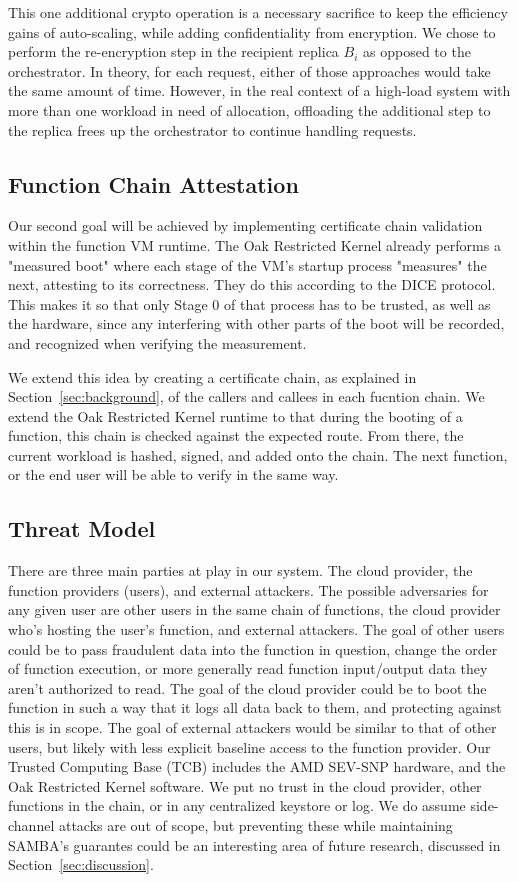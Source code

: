 This one additional crypto operation is a necessary sacrifice to keep the efficiency gains of auto-scaling, while adding confidentiality from encryption.
We chose to perform the re-encryption step in the recipient replica $B_i$ as opposed to the orchestrator.
In theory, for each request, either of those approaches would take the same amount of time.
However, in the real context of a high-load system with more than one workload in need of allocation, offloading the additional step to the replica frees up the orchestrator to continue handling requests.


\subsection{Function Chain Attestation}

Our second goal will be achieved by implementing certificate chain validation within the function VM runtime.
The Oak Restricted Kernel already performs a "measured boot" where each stage of the VM's startup process "measures" the next, attesting to its correctness.
They do this according to the DICE protocol.
This makes it so that only Stage 0 of that process has to be trusted, as well as the hardware, since any interfering with other parts of the boot will be recorded, and recognized when verifying the measurement.

We extend this idea by creating a certificate chain, as explained in Section~\ref{sec:background}, of the callers and callees in each fucntion chain.
We extend the Oak Restricted Kernel runtime to that during the booting of a function, this chain is checked against the expected route.
From there, the current workload is hashed, signed, and added onto the chain.
The next function, or the end user will be able to verify in the same way.

\subsection{Threat Model}

There are three main parties at play in our system. The cloud provider, the function providers (users), and external attackers.
The possible adversaries for any given user are other users in the same chain of functions, the cloud provider who's hosting the user's function, and external attackers.
The goal of other users could be to pass fraudulent data into the function in question, change the order of function execution, or more generally read function input/output data they aren't authorized to read.
The goal of the cloud provider could be to boot the function in such a way that it logs all data back to them, and protecting against this is in scope.
The goal of external attackers would be similar to that of other users, but likely with less explicit baseline access to the function provider.
Our Trusted Computing Base (TCB) includes the AMD SEV-SNP hardware, and the Oak Restricted Kernel software.
We put no trust in the cloud provider, other functions in the chain, or in any centralized keystore or log.
We do assume side-channel attacks are out of scope, but preventing these while maintaining SAMBA's guarantes could be an interesting area of future research, discussed in Section~\ref{sec:discussion}.


